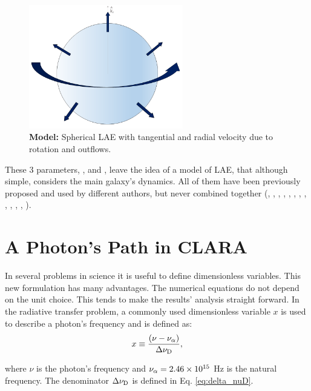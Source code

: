 \begin{figure}[h!]
	\begin{center}
		\includegraphics[width=0.6\textwidth]{./figures/chapter2/model}
	\end{center}
	\caption{\textbf{Model:} Spherical LAE with tangential and radial velocity due to rotation and outflows.
		\label{fig:model}}
\end{figure}


These 3 parameters, \vrot, \vout and \tauh, leave the idea of a model of LAE, that although simple, considers the main galaxy's dynamics. All of them have been previously proposed and used by different authors, but never combined together (\cite{Adams72}, \cite{Harrington73}, \cite{Neufeld90}, \cite{Dijkstra06}, \cite{Verhamme06}, \cite{Forero12}, \cite{Martin2015}, \cite{Garavito14}, \cite{Neufeld91}, \cite{Laursen09}, \cite{Barnes11}, \cite{Verhamme12}, \cite{Yajima12}).\\

\section{A \lya Photon's Path in CLARA}
In several problems in science it is useful to define dimensionless variables. This new formulation has many advantages. The numerical equations do not depend on the unit choice. This tends to make the results' analysis straight forward. In the \lya radiative transfer problem, a commonly used dimensionless variable $x$ is used to describe a photon's frequency and is defined as:\\

\begin{equation}
\label{eq:x_freq}
x \equiv \frac{(\nu -\nu_{\rm \alpha})}{\Delta\nu_{\rm D}},
\end{equation} 

where $\nu$ is the photon's frequency and $\nu_{\rm \alpha} = 2.46\times 10^{15}$ Hz is the \lya natural frequency. The denominator $\Delta\nu_{\rm D}$ is defined in Eq. \ref{eq:delta_nuD}.


